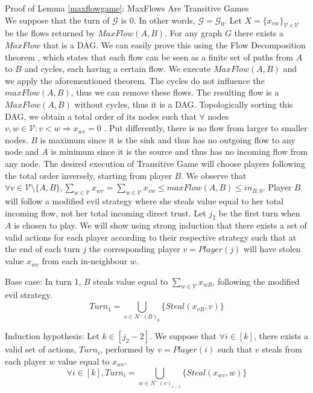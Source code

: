 \begin{sepproof}{Proof of Lemma \ref{maxflowgame}: MaxFlows Are Transitive Games} \ \\
\label{maxflowgameproof}
  We suppose that the turn of $\mathcal{G}$ is 0. In other words, $\mathcal{G} = \mathcal{G}_0$. Let
  $X = \{x_{vw}\}_{\mathcal{V} \times \mathcal{V}}$ be the flows returned by $MaxFlow\left(A, B\right)$. For any graph
  $G$ there exists a $MaxFlow$ that is a DAG. We can easily prove this using the Flow Decomposition theorem
  \cite{amo}, which states that each flow can be seen as a finite set of paths from $A$ to $B$ and cycles, each
  having a certain flow. We execute $MaxFlow\left(A, B\right)$ and we apply the aforementioned theorem. The
  cycles do not influence the $maxFlow\left(A, B\right)$, thus we can remove these flows. The resulting flow is a
  $MaxFlow\left(A, B\right)$ without cycles, thus it is a DAG. Topologically sorting this DAG, we obtain a total order
  of its nodes such that $\forall$ nodes $v, w \in \mathcal{V} : v < w \Rightarrow x_{wv} = 0$ \cite{clrs}. Put
  differently, there is no flow from larger to smaller nodes. $B$ is maximum since it is the sink and thus has no
  outgoing flow to any node and $A$ is minimum since it is the source and thus has no incoming flow from any node. The
  desired execution of Transitive Game will choose players following the total order inversely, starting from player
  $B$. We observe that $\forall v \in \mathcal{V} \setminus \{A, B\}, \sum\limits_{w \in \mathcal{V}}x_{wv} =
  \sum\limits_{w \in \mathcal{V}}x_{vw} \leq maxFlow\left(A, B\right) \leq in_{B, 0}$. Player $B$ will follow a modified
  evil strategy where she steals value equal to her total incoming flow, not her total incoming direct trust. Let $j_2$ be
  the first turn when $A$ is chosen to play. We will show using strong induction that there exists a set of valid actions
  for each player according to their respective strategy such that at the end of each turn $j$ the corresponding player
  $v = Player\left(j\right)$ will have stolen value $x_{wv}$ from each in-neighbour $w$.

  Base case: In turn 1, $B$ steals value equal to $\sum\limits_{w \in \mathcal{V}}x_{wB}$, following the modified evil
  strategy.
  \begin{equation*}
    Turn_1 = \bigcup\limits_{v \in N^{-}\left(B\right)_0}\{Steal\left(x_{vB}, v\right)\}
  \end{equation*}

  Induction hypothesis: Let $k \in [j_2 - 2]$. We suppose that $\forall i \in [k]$, there exists a valid set of actions,
  $Turn_i$, performed by $v = Player\left(i\right)$ such that $v$ steals from each player $w$ value equal to $x_{wv}$.
  \begin{equation*}
    \forall i \in [k], Turn_i = \bigcup\limits_{w \in N^{-}\left(v\right)_{i-1}}\{Steal\left(x_{wv}, w\right)\}
  \end{equation*}


\end{sepproof}
